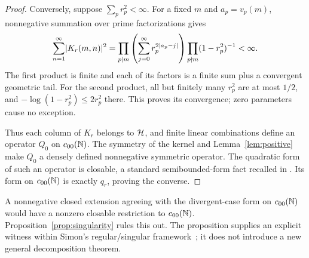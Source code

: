 \begin{proof}
Conversely, suppose $\sum_p r_p^2<\infty$.
For a fixed $m$ and $a_p=v_p(m)$, nonnegative summation over prime
factorizations gives
\begin{equation}
 \sum_{n=1}^{\infty}\lvert K_r(m,n)\rvert^2
 =
 \prod_{p\mid m}
 \left(\sum_{j=0}^{\infty}r_p^{2\lvert a_p-j\rvert}\right)
 \prod_{p\nmid m}(1-r_p^2)^{-1}<\infty.
 \label{eq:column-l2}
\end{equation}
The first product is finite and each of its factors is a finite sum plus
a convergent geometric tail. For the second product, all but finitely
many $r_p^2$ are at most $1/2$, and
$-\log(1-r_p^2)\le2r_p^2$ there. This proves its convergence; zero
parameters cause no exception.

Thus each column of $K_r$ belongs to $\mathcal{H}$, and finite linear
combinations define an operator $Q_0$ on $c_{00}(\mathbb{N})$.
The symmetry of the kernel and Lemma~\ref{lem:positive} make $Q_0$ a
densely defined nonnegative symmetric operator.
The quadratic form of such an operator is closable, a standard
semibounded-form fact recalled in \citet[Section~2.1]{yafaev2017semibounded}.
Its form on $c_{00}(\mathbb{N})$ is exactly $q_r$, proving the converse.
\end{proof}

A nonnegative closed extension agreeing with the divergent-case form
on $c_{00}(\mathbb{N})$ would have a nonzero closable restriction to $c_{00}(\mathbb{N})$.
Proposition~\ref{prop:singularity} rules this out. The proposition supplies
an explicit witness within Simon's regular/singular
framework~\citep{simon1978canonical}; it does not introduce a new
general decomposition theorem.
